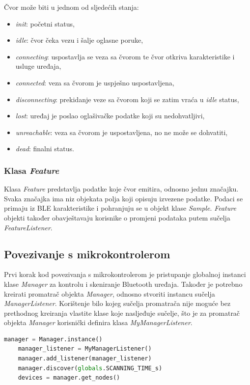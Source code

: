 Čvor može biti u jednom od sljedećih stanja:
\begin{itemize}
	\item \textit{init}: početni status,
	\item \textit{idle}: čvor čeka vezu i šalje oglasne poruke,
	\item \textit{connecting}: uspostavlja se veza sa čvorom te čvor otkriva karakteristike i usluge uređaja,
	\item \textit{connected}: veza sa čvorom je uspješno uspostavljena, 
	\item \textit{disconnecting}: prekidanje veze sa čvorom koji se zatim vraća u \textit{idle} status, 
	\item \textit{lost}: uređaj je poslao oglašivačke podatke koji su nedohvatljivi,
	\item \textit{unreachable}: veza sa čvorom je uspostavljena, no ne može se dohvatiti, 
	\item \textit{dead}: finalni status.
\end{itemize}

\subsubsection{Klasa \textit{Feature}}
Klasa \textit{Feature} predstavlja podatke koje čvor emitira, odnosno jednu značajku. Svaka značajka ima niz objekata polja koji opisuju izvezene podatke. Podaci se primaju iz BLE karakteristike i pohranjuju se u objekt klase \textit{Sample}. \textit{Feature} objekti također obavještavaju korisnike o promjeni podataka putem sučelja \textit{FeatureListener}.


\subsection{Povezivanje s mikrokontrolerom}

Prvi korak kod povezivanja s mikrokontrolerom je pristupanje globalnoj instanci klase \textit{Manager} za kontrolu i skeniranje Bluetooth uređaja. Također je potrebno kreirati promatrač objekta \textit{Manager}, odnosno stvoriti instancu sučelja \textit{ManagerListener}. Korištenje bilo kojeg sučelja promatrača nije moguće bez prethodnog kreiranja vlastite klase koje nasljeđuje sučelje, što je za promatrač objekta \textit{Manager} korisnički definira klasa \textit{MyManagerListener}. 

\begin{lstlisting}[language=Python, caption={Pristup instanci \textit{Manager} i skeniranje Bluetooth uređaja}]
	manager = Manager.instance()
	manager_listener = MyManagerListener()
	manager.add_listener(manager_listener)
	manager.discover(globals.SCANNING_TIME_s)
	devices = manager.get_nodes()
\end{lstlisting}

